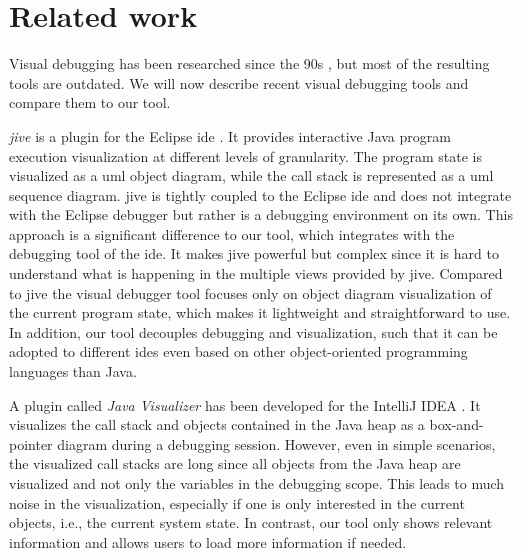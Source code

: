 \documentclass[conference]{IEEEtran}
\newcommand{\intellij}{IntelliJ IDEA}
\begin{document}
\section{Related work} \label{sec:relatedWork}
Visual debugging has been researched since the 90s \cite{baeza-yatesVisualDebuggingAutomatic1996, jerdingUsingVisualizationFoster1994, mukherjeaVisualDebuggingIntegrating1994, hansonSimpleExtensibleGraphical1997}, but most of the resulting tools are outdated.
We will now describe recent visual debugging tools and compare them to our tool.

\textit{\gls*{jive}} is a plugin for the Eclipse \gls*{ide} \cite{czyzDeclarativeVisualDebugging2007,k.p.FiniteStateModel2021, JIVEJavaInteractive}.
It provides interactive Java program execution visualization at different levels of granularity.
The program state is visualized as a \gls*{uml} object diagram, while the call stack is represented as a \gls*{uml} sequence diagram.
\gls*{jive} is tightly coupled to the Eclipse \gls*{ide} and does not integrate with the Eclipse debugger but rather is a debugging environment on its own.
This approach is a significant difference to our tool, which integrates with the debugging tool of the \gls*{ide}.
It makes \gls*{jive} powerful but complex since it is hard to understand what is happening in the multiple views provided by \gls*{jive}.
Compared to \gls*{jive} the visual debugger tool focuses only on object diagram visualization of the current program state, which makes it lightweight and straightforward to use.
In addition, our tool decouples debugging and visualization, such that it can be adopted to different \glspl*{ide} even based on other object-oriented programming languages than Java.

A plugin called \textit{Java Visualizer} has been developed for the \intellij{} \cite{JavaVisualizerIntelliJ}.
It visualizes the call stack and objects contained in the Java heap as a box-and-pointer diagram during a debugging session.
However, even in simple scenarios, the visualized call stacks are long since all objects from the Java heap are visualized and not only the variables in the debugging scope.
This leads to much noise in the visualization, especially if one is only interested in the current objects, i.e., the current system state.
In contrast, our tool only shows relevant information and allows users to load more information if needed.
\end{document}
